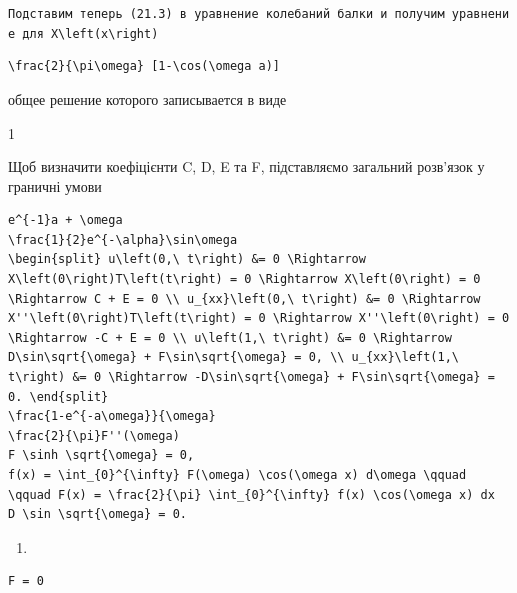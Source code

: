 \documentclass[
  ukrainian,
]{article}
\providecommand{\tightlist}{%
  \setlength{\itemsep}{0pt}\setlength{\parskip}{0pt}}
\begin{document}
\texttt{Подставим\ теперь\ (21.3)\ в\ уравнение\ колебаний\ балки\ и\ получим\ уравнение\ для\ \textquotesingle{}X\textbackslash{}left(x\textbackslash{}right)\textquotesingle{}}

\begin{verbatim}
\frac{2}{\pi\omega} [1-\cos(\omega a)]
\end{verbatim}

общее решение которого записывается в виде

1

Щоб визначити коефіцієнти C, D, E та F, підставляємо загальний розв'язок
у граничні умови

\begin{verbatim}
e^{-1}a + \omega
\frac{1}{2}e^{-\alpha}\sin\omega
\begin{split} u\left(0,\ t\right) &= 0 \Rightarrow X\left(0\right)T\left(t\right) = 0 \Rightarrow X\left(0\right) = 0 \Rightarrow C + E = 0 \\ u_{xx}\left(0,\ t\right) &= 0 \Rightarrow X''\left(0\right)T\left(t\right) = 0 \Rightarrow X''\left(0\right) = 0 \Rightarrow -C + E = 0 \\ u\left(1,\ t\right) &= 0 \Rightarrow D\sin\sqrt{\omega} + F\sin\sqrt{\omega} = 0, \\ u_{xx}\left(1,\ t\right) &= 0 \Rightarrow -D\sin\sqrt{\omega} + F\sin\sqrt{\omega} = 0. \end{split}
\frac{1-e^{-a\omega}}{\omega}
\frac{2}{\pi}F''(\omega)
F \sinh \sqrt{\omega} = 0,
f(x) = \int_{0}^{\infty} F(\omega) \cos(\omega x) d\omega \qquad \qquad F(x) = \frac{2}{\pi} \int_{0}^{\infty} f(x) \cos(\omega x) dx
D \sin \sqrt{\omega} = 0.
\end{verbatim}

\begin{enumerate}
\def\labelenumi{\arabic{enumi}.}
\tightlist
\item
\end{enumerate}

\begin{verbatim}
F = 0
\end{verbatim}
\end{document}
